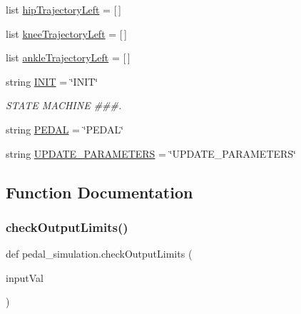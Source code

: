 \begin{DoxyCompactItemize}
list \mbox{\hyperlink{namespacepedal__simulation_abe8e07684ed66f9eb97c465a534b3100}{hip\+Trajectory\+Left}} = \mbox{[}$\,$\mbox{]}
\item 
list \mbox{\hyperlink{namespacepedal__simulation_a70a2d946d5cdbbc879ebdfa02ae32ba7}{knee\+Trajectory\+Left}} = \mbox{[}$\,$\mbox{]}
\item 
list \mbox{\hyperlink{namespacepedal__simulation_a3f5a09536c7fd1d22868f6b4f0d4b463}{ankle\+Trajectory\+Left}} = \mbox{[}$\,$\mbox{]}
\item 
string \mbox{\hyperlink{namespacepedal__simulation_adb56d67efb49b0725d77e8d179881ef7}{I\+N\+IT}} = \char`\"{}I\+N\+IT\char`\"{}
\begin{DoxyCompactList}\small\item\em S\+T\+A\+TE M\+A\+C\+H\+I\+NE \#\#\#. \end{DoxyCompactList}\item 
string \mbox{\hyperlink{namespacepedal__simulation_a30639c182756f273383e09a638279670}{P\+E\+D\+AL}} = \char`\"{}P\+E\+D\+AL\char`\"{}
\item 
string \mbox{\hyperlink{namespacepedal__simulation_aad3596794738ffb413aee3addc42fa95}{U\+P\+D\+A\+T\+E\+\_\+\+P\+A\+R\+A\+M\+E\+T\+E\+RS}} = \char`\"{}U\+P\+D\+A\+T\+E\+\_\+\+P\+A\+R\+A\+M\+E\+T\+E\+RS\char`\"{}
\end{DoxyCompactItemize}


\subsection{Function Documentation}
\mbox{\label{namespacepedal__simulation_a880354a926adb358b5ef68766f42639b}} 
\subsubsection{\texorpdfstring{checkOutputLimits()}{checkOutputLimits()}}
{\footnotesize\ttfamily def pedal\+\_\+simulation.\+check\+Output\+Limits (\begin{DoxyParamCaption}\item[{}]{input\+Val }\end{DoxyParamCaption})}

\mbox{\label{namespacepedal__simulation_a882041c9627d3986d4a997a1d4aac41a}} 
